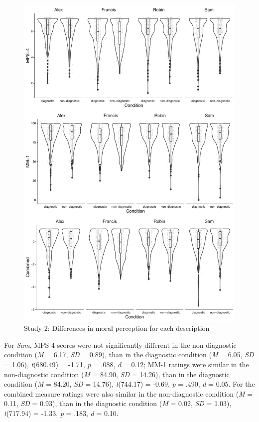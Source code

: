 \documentclass[
  american,
  man,floatsintext]{apa7}
\begin{document}
\begin{figure}[!p]
\includegraphics{Supplementary_files/figure-latex/S2allscenariosPlot-1} \caption{Study 2: Differences in moral perception for each description}\label{fig:S2allscenariosPlot}
\end{figure}

For \emph{Sam}, MPS-4 scores were not significantly different in the non-diagnostic condition (\emph{M} = 6.17, \emph{SD} = 0.89), than in the diagnostic condition (\emph{M} = 6.05, \emph{SD} = 1.06), \emph{t}(680.49) = -1.71, \emph{p} = .088, \emph{d} = 0.12; MM-1 ratings were similar in the non-diagnostic condition (\emph{M} = 84.90, \emph{SD} = 14.26), than in the diagnostic condition (\emph{M} = 84.20, \emph{SD} = 14.76), \emph{t}(744.17) = -0.69, \emph{p} = .490, \emph{d} = 0.05. For the combined measure ratings were also similar in the non-diagnostic condition (\emph{M} = 0.11, \emph{SD} = 0.93), than in the diagnostic condition (\emph{M} = 0.02, \emph{SD} = 1.03), \emph{t}(717.94) = -1.33, \emph{p} = .183, \emph{d} = 0.10.
\end{document}
